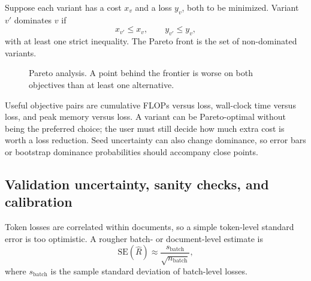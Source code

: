 \documentclass[11pt,a4paper]{article}
\theoremstyle{definition}
\theoremstyle{plain}
\begin{document}
Suppose each variant has a cost $x_v$ and a loss $y_v$, both to be minimized. Variant $v'$ dominates $v$ if
\begin{equation}
    x_{v'}\leq x_v,
    \qquad y_{v'}\leq y_v,
\end{equation}
with at least one strict inequality. The Pareto front is the set of non-dominated variants.

\begin{figure}[H]
\centering
{}
\caption{Pareto analysis. A point behind the frontier is worse on both objectives than at least one alternative.}
\label{fig:pareto}
\end{figure}

Useful objective pairs are cumulative FLOPs versus loss, wall-clock time versus loss, and peak memory versus loss. A variant can be Pareto-optimal without being the preferred choice; the user must still decide how much extra cost is worth a loss reduction. Seed uncertainty can also change dominance, so error bars or bootstrap dominance probabilities should accompany close points.


\subsection{Validation uncertainty, sanity checks, and calibration}

Token losses are correlated within documents, so a simple token-level standard error is too optimistic. A rougher batch- or document-level estimate is
\begin{equation}
    \mathrm{SE}(\widehat R)\approx \frac{s_{\mathrm{batch}}}{\sqrt{n_{\mathrm{batch}}}},
\end{equation}
where $s_{\mathrm{batch}}$ is the sample standard deviation of batch-level losses.
\end{document}
